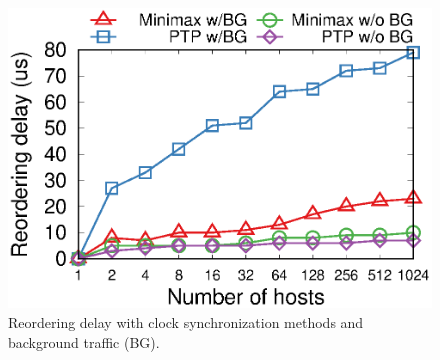 \begin{figure}[t!]
\begin{minipage}{.31\textwidth}
		\centering
		\includegraphics[width=\textwidth]{gnuplot/reordering_delay.eps}
		\caption{Reordering delay with clock synchronization methods and background traffic (BG).}
		\label{fig:clock-sync}
	\end{minipage}
	\hspace{0.01\textwidth}
    \begin{minipage}{.31\textwidth}
      \centering
      \vspace{0.01\textwidth}

\end{minipage}
\end{figure}
